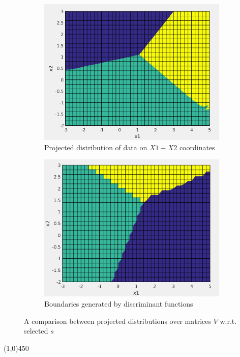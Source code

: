 \documentclass[12pt]{article}
\begin{document}
\begin{enumerate}
\begin{figure}[h]
\centering
\begin{subfigure}{0.4\textwidth}
\includegraphics[scale=0.3]{Imgs/3-2.png}
\caption{Projected distribution of data on $X1-X2$ coordinates}
\end{subfigure}
\begin{subfigure}{0.4\textwidth}
\includegraphics[scale=0.3]{Imgs/3-3.png}
\caption{Boundaries generated by discriminant functions}
\end{subfigure}
\caption{A comparison between projected distributions over matrices $V$ w.r.t. selected $s$}
\label{fig:3-2}
\end{figure}


\begin{center}
\line(1,0){450}
\end{center}



\end{enumerate}
\end{document}
